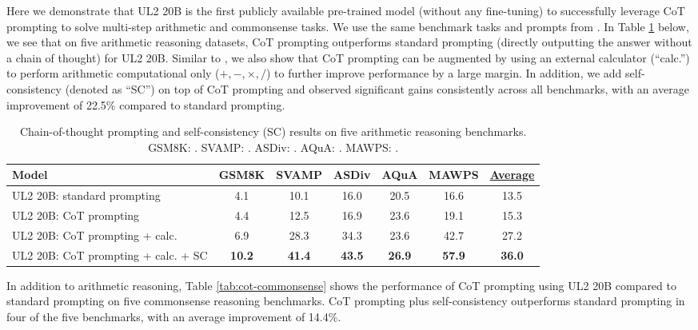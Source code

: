 \documentclass[10pt]{article}
\begin{document}
Here we demonstrate that UL2 20B is the first publicly available pre-trained model (without any fine-tuning) to successfully leverage CoT prompting to solve multi-step arithmetic and commonsense tasks.
We use the same benchmark tasks and prompts from \citet{wei2022chain}.
In Table \ref{tab:cot-arithmetic} below, we see that on five arithmetic reasoning datasets, CoT prompting outperforms standard prompting (directly outputting the answer without a chain of thought) for UL2 20B.
Similar to \citet{wei2022chain}, we also show that CoT prompting can be augmented by using an external calculator (``calc.'') to perform arithmetic computational only ($+,-,\times,/$) to further improve performance by a large margin. In addition, we add self-consistency \citep{self_consistency} (denoted as ``SC'') on top of CoT prompting and observed significant gains consistently across all benchmarks, with an average improvement of 22.5\% compared to standard prompting.

\begin{table}[H]
    \centering
    \small
      \caption{Chain-of-thought prompting and self-consistency (SC) results on five arithmetic reasoning benchmarks.
      GSM8K: \citep{cobbe2021training}.
      SVAMP: \citep{patel-etal-2021-nlp}.
      ASDiv: \citep{miao-etal-2020-diverse}.
      AQuA: \citep{ling-etal-2017-program}.
      MAWPS: \citep{koncel-kedziorski-etal-2016-mawps}.
      }
    \label{tab:cot-arithmetic}
    \begin{tabular}{l ccccc c}
    \toprule 
    Model     & GSM8K & SVAMP & ASDiv & AQuA & MAWPS & \underline{Average} \\
    \midrule 
   UL2 20B: standard prompting & 4.1 & 10.1 & 16.0 & 20.5 & 16.6 & 13.5 \\
    UL2 20B: CoT prompting & 4.4 & 12.5 & 16.9 & 23.6 & 19.1 & 15.3 \\
    UL2 20B: CoT prompting + calc. & 6.9 & 28.3 & 34.3 & 23.6 & 42.7 & 27.2 \\
    UL2 20B: CoT prompting + calc. + SC & \textbf{10.2} & \textbf{41.4} & \textbf{43.5} & \textbf{26.9} & \textbf{57.9} & \textbf{36.0}\\
    \bottomrule
    \end{tabular}
\end{table}

In addition to arithmetic reasoning, Table \ref{tab:cot-commonsense} shows the performance of CoT prompting using UL2 20B compared to standard prompting on five commonsense reasoning benchmarks.
CoT prompting plus self-consistency outperforms standard prompting in four of the five benchmarks, with an average improvement of 14.4\%. 
\end{document}
